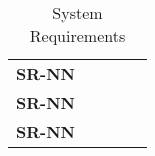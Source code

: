 \begin{table}[H]
	\begin{tabularx}{\textwidth}{| a | x | a | a | a |}
		\hline
		     &  &  &  &  \\
		\hline
		\textbf{SR-NN} &                              &            &            &            \\
		\hline
		\textbf{SR-NN} &                              &            &            &            \\
		\hline
		\textbf{SR-NN} &                              &            &            &            \\
		\hline
	\end{tabularx}
	\caption{System Requirements}
\end{table}

